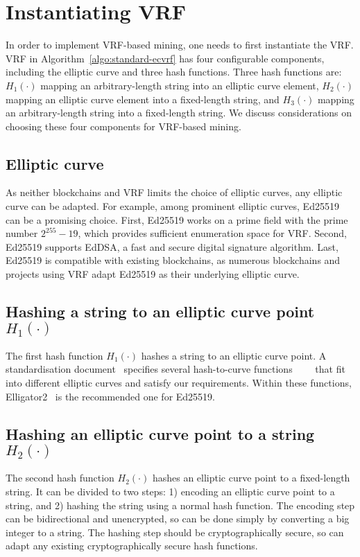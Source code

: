 \section{Instantiating VRF}
\label{sec:instantiation}

In order to implement VRF-based mining, one needs to first instantiate the VRF.
VRF in Algorithm~\ref{algo:standard-ecvrf} has four configurable components, including the elliptic curve and three hash functions.
Three hash functions are:
$H_{1}(\cdot)$ mapping an arbitrary-length string into an elliptic curve element,
$H_{2}(\cdot)$ mapping an elliptic curve element into a fixed-length string, and
$H_{3}(\cdot)$ mapping an arbitrary-length string into a fixed-length string.
We discuss considerations on choosing these four components for VRF-based mining.





\subsection{Elliptic curve}
As neither blockchains and VRF limits the choice of elliptic curves, any elliptic curve can be adapted.
For example, among prominent elliptic curves, Ed25519~\cite{bernstein2012high} can be a promising choice.
First, Ed25519 works on a prime field with the prime number $2^{255} - 19$, which provides sufficient enumeration space for VRF.
Second, Ed25519 supports EdDSA, a fast and secure digital signature algorithm.
Last, Ed25519 is compatible with existing blockchains, as numerous blockchains and projects using VRF adapt Ed25519 as their underlying elliptic curve.



\subsection{Hashing a string to an elliptic curve point $H_{1}(\cdot)$}
The first hash function $H_{1}(\cdot)$ hashes a string to an elliptic curve point.
A standardisation document~\cite{scott2019hashing} specifies several hash-to-curve functions~\cite{icart2009hash}~\cite{ulas2007rational}~\cite{brier2010efficient}~\cite{bernstein2013elligator} that fit into different elliptic curves and satisfy our requirements.
Within these functions, Elligator2~\cite{bernstein2013elligator} is the recommended one for Ed25519.




\subsection{Hashing an elliptic curve point to a string $H_{2}(\cdot)$}
The second hash function $H_{2}(\cdot)$ hashes an elliptic curve point to a fixed-length string.
It can be divided to two steps: 1) encoding an elliptic curve point to a string, and 2) hashing the string using a normal hash function.
The encoding step can be bidirectional and unencrypted, so can be done simply by converting a big integer to a string.
The hashing step should be cryptographically secure, so can adapt any existing cryptographically secure hash functions.


